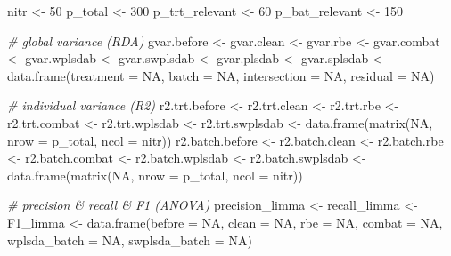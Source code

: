 \documentclass[
]{book}
\newenvironment{Shaded}{\begin{snugshade}}{\end{snugshade}}
\newcommand{\AttributeTok}[1]{\textcolor[rgb]{0.77,0.63,0.00}{#1}}
\newcommand{\CommentTok}[1]{\textcolor[rgb]{0.56,0.35,0.01}{\textit{#1}}}
\newcommand{\ConstantTok}[1]{\textcolor[rgb]{0.00,0.00,0.00}{#1}}
\newcommand{\DecValTok}[1]{\textcolor[rgb]{0.00,0.00,0.81}{#1}}
\newcommand{\FunctionTok}[1]{\textcolor[rgb]{0.00,0.00,0.00}{#1}}
\newcommand{\NormalTok}[1]{#1}
\newcommand{\OtherTok}[1]{\textcolor[rgb]{0.56,0.35,0.01}{#1}}
\begin{document}
\begin{Shaded}
\begin{Highlighting}[]
\NormalTok{nitr }\OtherTok{\textless{}{-}} \DecValTok{50}
\NormalTok{p\_total }\OtherTok{\textless{}{-}} \DecValTok{300}
\NormalTok{p\_trt\_relevant }\OtherTok{\textless{}{-}} \DecValTok{60}
\NormalTok{p\_bat\_relevant }\OtherTok{\textless{}{-}} \DecValTok{150}

\CommentTok{\# global variance (RDA)}
\NormalTok{gvar.before }\OtherTok{\textless{}{-}}\NormalTok{ gvar.clean }\OtherTok{\textless{}{-}}\NormalTok{ gvar.rbe }\OtherTok{\textless{}{-}}\NormalTok{ gvar.combat }\OtherTok{\textless{}{-}} 
\NormalTok{  gvar.wplsdab }\OtherTok{\textless{}{-}}\NormalTok{ gvar.swplsdab }\OtherTok{\textless{}{-}}\NormalTok{ gvar.plsdab }\OtherTok{\textless{}{-}} 
\NormalTok{  gvar.splsdab }\OtherTok{\textless{}{-}} \FunctionTok{data.frame}\NormalTok{(}\AttributeTok{treatment =} \ConstantTok{NA}\NormalTok{, }\AttributeTok{batch =} \ConstantTok{NA}\NormalTok{,  }
                             \AttributeTok{intersection =} \ConstantTok{NA}\NormalTok{, }
                             \AttributeTok{residual =} \ConstantTok{NA}\NormalTok{)}

\CommentTok{\# individual variance (R2)}
\NormalTok{r2.trt.before }\OtherTok{\textless{}{-}}\NormalTok{ r2.trt.clean }\OtherTok{\textless{}{-}}\NormalTok{ r2.trt.rbe  }\OtherTok{\textless{}{-}}\NormalTok{ r2.trt.combat }\OtherTok{\textless{}{-}} 
\NormalTok{  r2.trt.wplsdab }\OtherTok{\textless{}{-}}\NormalTok{ r2.trt.swplsdab }\OtherTok{\textless{}{-}} \FunctionTok{data.frame}\NormalTok{(}\FunctionTok{matrix}\NormalTok{(}\ConstantTok{NA}\NormalTok{, }\AttributeTok{nrow =}\NormalTok{ p\_total, }
                                                         \AttributeTok{ncol =}\NormalTok{ nitr))}
\NormalTok{r2.batch.before }\OtherTok{\textless{}{-}}\NormalTok{ r2.batch.clean }\OtherTok{\textless{}{-}}\NormalTok{ r2.batch.rbe  }\OtherTok{\textless{}{-}}\NormalTok{ r2.batch.combat }\OtherTok{\textless{}{-}} 
\NormalTok{  r2.batch.wplsdab }\OtherTok{\textless{}{-}}\NormalTok{ r2.batch.swplsdab }\OtherTok{\textless{}{-}} \FunctionTok{data.frame}\NormalTok{(}\FunctionTok{matrix}\NormalTok{(}\ConstantTok{NA}\NormalTok{, }\AttributeTok{nrow =}\NormalTok{ p\_total, }
                                                             \AttributeTok{ncol =}\NormalTok{ nitr))}

\CommentTok{\# precision \& recall \& F1 (ANOVA)}
\NormalTok{precision\_limma }\OtherTok{\textless{}{-}}\NormalTok{ recall\_limma }\OtherTok{\textless{}{-}}\NormalTok{ F1\_limma }\OtherTok{\textless{}{-}} 
  \FunctionTok{data.frame}\NormalTok{(}\AttributeTok{before =} \ConstantTok{NA}\NormalTok{, }\AttributeTok{clean =} \ConstantTok{NA}\NormalTok{, }\AttributeTok{rbe =} \ConstantTok{NA}\NormalTok{, }\AttributeTok{combat =} \ConstantTok{NA}\NormalTok{, }
             \AttributeTok{wplsda\_batch =} \ConstantTok{NA}\NormalTok{, }\AttributeTok{swplsda\_batch =} \ConstantTok{NA}\NormalTok{)}


\end{Highlighting}
\end{Shaded}
\end{document}
